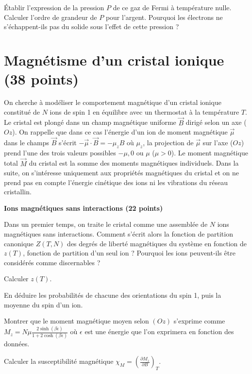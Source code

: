 \documentclass[utf8, 11pt]{feuille}
\begin{document}
\question \'Etablir  l’expression de la pression $P$ de ce gaz de Fermi à température nulle. Calculer l’ordre de grandeur de $P$ pour l’argent. Pourquoi les électrons ne s’échappent-ils pas du solide sous l’effet de cette pression ?

\section{Magnétisme d'un cristal ionique (38 points)}
On cherche à modéliser le comportement magnétique d’un cristal ionique constitué de $N$ ions
de spin 1 en équilibre avec un thermostat à la température $T$. Le cristal est plongé dans un champ
magnétique uniforme $\Vec{B}$ dirigé selon un axe ($Oz$). On rappelle que dans ce cas l'énergie d'un ion
de moment magnétique $\Vec{\mu}$  dans le champs $\Vec{B}$ s’écrit $-\Vec{\mu} \cdot \Vec{B}= - \mu_z B$ où $\mu_z$, la projection de
$\Vec{\mu}$ sur l’axe ($Oz$) prend l’une des trois valeurs possibles $ - \mu, 0$ ou $\mu$ ($\mu >0$). Le moment magnétique total $\Vec{M}$ du cristal est la somme des moments magnétiques individuels. Dans la suite, on s’intéresse uniquement aux propriétés magnétiques
du cristal et on ne prend pas en compte l'énergie cinétique des ions ni les vibrations du réseau cristallin.

{\sffamily\bfseries{Ions magnétiques sans interactions (22 points)}}

Dans un premier temps, on traite le cristal comme une assemblée de $N$ ions magnétiques sans interactions.
\question  Comment s'écrit alors la fonction de partition canonique $Z(T, N)$  des degrés de liberté magnétiques du système en fonction de $z(T)$, fonction de partition d’un seul ion ?
Pourquoi les ions peuvent-ils être considérés comme discernables ?

\question Calculer $z(T)$.

\question En déduire les probabilités de chacune des orientations du spin 1, puis la moyenne du spin d'un ion.

\question Montrer que le moment magnétique moyen selon $(Oz)$ s'exprime comme $M_z=N\mu \frac{2 \sinh{(\beta \epsilon)}}{1+2 \cosh{(\beta \epsilon)}}$ où $\epsilon$ est une énergie que l'on exprimera en fonction des données.

\question Calculer la susceptibilité magnétique $\chi_M=\left( \frac{\partial M_z}{\partial B}\right)_T$.
\end{document}
